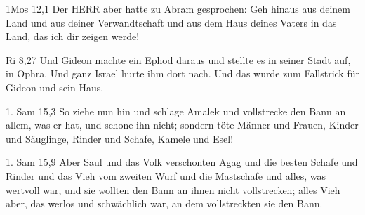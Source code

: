 \documentclass[aspectratio=43]{beamer}
\begin{document}
\begin{frame}  
    \vspace*{1cm}
        \begin{exampleblock}{1Mos 12,1}
            \color{black}            
            Der HERR aber hatte zu Abram gesprochen: Geh hinaus aus deinem Land und aus deiner Verwandtschaft und aus dem Haus deines Vaters in das Land, das ich dir zeigen werde!
        \end{exampleblock}  
    \vspace*{1cm}
\end{frame}
\begin{frame}  
    \vspace*{1cm}
        \begin{exampleblock}{Ri 8,27}
            \color{black}            
            Und Gideon machte ein Ephod daraus und stellte es in seiner Stadt auf, in Ophra. Und ganz Israel hurte ihm dort nach. Und das wurde zum Fallstrick für Gideon und sein Haus.
        \end{exampleblock}  
    \vspace*{1cm}
\end{frame}
\begin{frame}  
    \vspace*{1cm}
        \begin{exampleblock}{1. Sam 15,3}
            \color{black}            
            So ziehe nun hin und schlage Amalek und vollstrecke den Bann an allem, was er hat, und schone ihn nicht; sondern töte Männer und Frauen, Kinder und Säuglinge, Rinder und Schafe, Kamele und Esel!
        \end{exampleblock}  
    \vspace*{1cm}
\end{frame}
\begin{frame}  
    \vspace*{1cm}
        \begin{exampleblock}{1. Sam 15,9}
            \color{black}            
            Aber Saul und das Volk verschonten Agag und die besten Schafe und Rinder und das Vieh vom zweiten Wurf und die Mastschafe und alles, was wertvoll war, und sie wollten den Bann an ihnen nicht vollstrecken; alles Vieh aber, das werlos und schwächlich war, an dem vollstreckten sie den Bann.
        \end{exampleblock}  
    \vspace*{1cm}
\end{frame}
\end{document}
